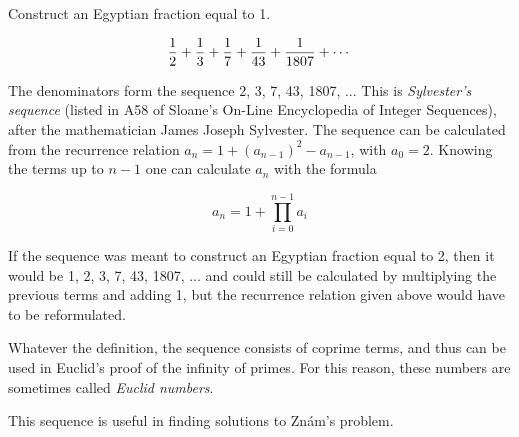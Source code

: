 \documentclass[12pt]{article}
\begin{document}
Construct an Egyptian fraction equal to 1.

$${1 \over 2} + {1 \over 3} + {1 \over 7} + {1 \over {43}} + {1 \over {1807}} + \cdots$$

The denominators form the sequence 2, 3, 7, 43, 1807, ... This is {\em Sylvester's sequence} (listed in A58 of Sloane's On-Line Encyclopedia of Integer Sequences), after the mathematician James Joseph Sylvester. The sequence can be calculated from the recurrence relation $a_n = 1 + (a_{n - 1})^2 - a_{n - 1}$, with $a_0 = 2$. Knowing the terms up to $n - 1$ one can calculate $a_n$ with the formula

$$a_n = 1 + \prod_{i = 0}^{n - 1} a_i$$

If the sequence was meant to construct an Egyptian fraction equal to 2, then it would be 1, 2, 3, 7, 43, 1807, ... and could still be calculated by multiplying the previous terms and adding 1, but the recurrence relation given above would have to be reformulated.

Whatever the definition, the sequence consists of coprime terms, and thus can be used in Euclid's proof of the infinity of primes. For this reason, these numbers are sometimes called {\em Euclid numbers}.

This sequence is useful in finding solutions to Zn\'am's problem.
\end{document}
